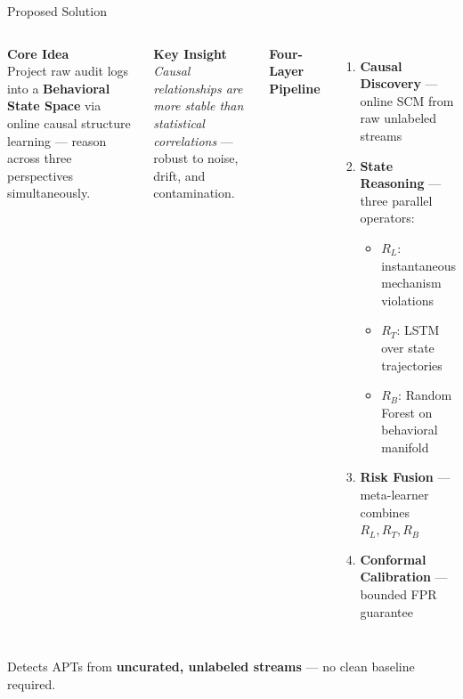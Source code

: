 \documentclass[aspectratio=169]{beamer}
\begin{document}
\begin{frame}{Proposed Solution}
  \small
  \begin{columns}[t]
      \textbf{Core Idea}\\[0.3em]
      Project raw audit logs into a \textbf{Behavioral State Space} via online causal structure learning --- reason across three perspectives simultaneously.

      \vspace{0.5em}
      \textbf{Key Insight}\\[0.3em]
      \textit{Causal relationships are more stable than statistical correlations} --- robust to noise, drift, and contamination.

      \textbf{Four-Layer Pipeline}
      \begin{enumerate}\footnotesize\setlength\itemsep{2pt}
        \item \textbf{Causal Discovery} --- online SCM from raw unlabeled streams
        \item \textbf{State Reasoning} --- three parallel operators:
          \begin{itemize}\setlength\itemsep{1pt}
            \item $R_L$: instantaneous mechanism violations
            \item $R_T$: LSTM over state trajectories
            \item $R_B$: Random Forest on behavioral manifold
          \end{itemize}
        \item \textbf{Risk Fusion} --- meta-learner combines $R_L, R_T, R_B$
        \item \textbf{Conformal Calibration} --- bounded FPR guarantee
      \end{enumerate}
  \end{columns}

  \vspace{0.3em}
  \begin{block}{}
    \centering\small Detects APTs from \textbf{uncurated, unlabeled streams} --- no clean baseline required.
  \end{block}
\end{frame}
\end{document}
